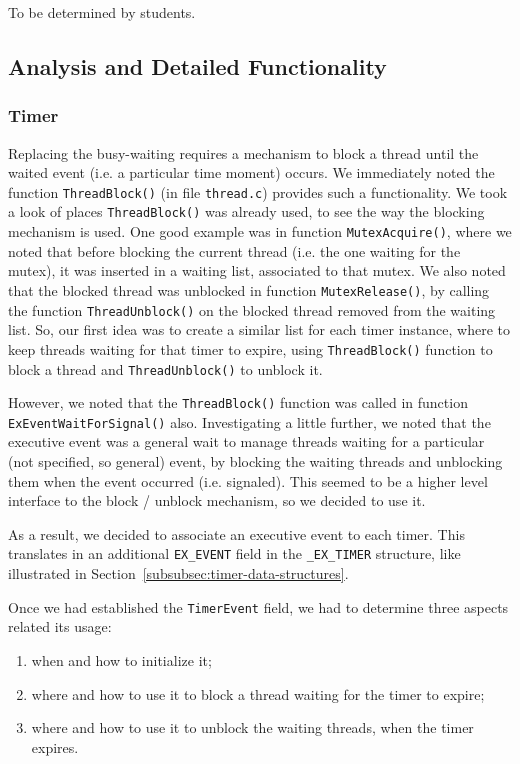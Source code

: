 To be determined by students.

\subsection{Analysis and Detailed Functionality}

\subsubsection{Timer}

Replacing the busy-waiting requires a mechanism to block a thread until the waited event (i.e. a particular time moment) occurs. We immediately noted the function \lstinline|ThreadBlock()| (in file \lstinline|thread.c|) provides such a functionality. We took a look of places \lstinline|ThreadBlock()| was already used, to see the way the blocking mechanism is used. One good example was in function \lstinline|MutexAcquire()|, where we noted that before blocking the current thread (i.e. the one waiting for the mutex), it was inserted in a waiting list, associated to that mutex. We also noted that the blocked thread was unblocked in function \lstinline|MutexRelease()|, by calling the function \lstinline|ThreadUnblock()| on the blocked thread removed from the waiting list. So, our first idea was to create a similar list for each timer instance, where to keep threads waiting for that timer to expire, using \lstinline|ThreadBlock()| function to block a thread and \lstinline|ThreadUnblock()| to unblock it.

However, we noted that the \lstinline|ThreadBlock()| function was called in function \lstinline|ExEventWaitForSignal()| also. Investigating a little further, we noted that the executive event was a general wait to manage threads waiting for a particular (not specified, so general) event, by blocking the waiting threads and unblocking them when the event occurred (i.e. signaled). This seemed to be a higher level interface to the block / unblock mechanism, so we decided to use it. 

As a result, we decided to associate an executive event to each timer. This translates in an additional \lstinline|EX_EVENT| field in the \lstinline|_EX_TIMER| structure, like illustrated in Section~\ref{subsubsec:timer-data-structures}. 

Once we had established the \lstinline|TimerEvent| field, we had to determine three aspects related its usage:
\begin{enumerate}
    \item when and how to initialize it;
    
    \item where and how to use it to block a thread waiting for the timer to expire;
    
    \item where and how to use it to unblock the waiting threads, when the timer expires.
\end{enumerate}


